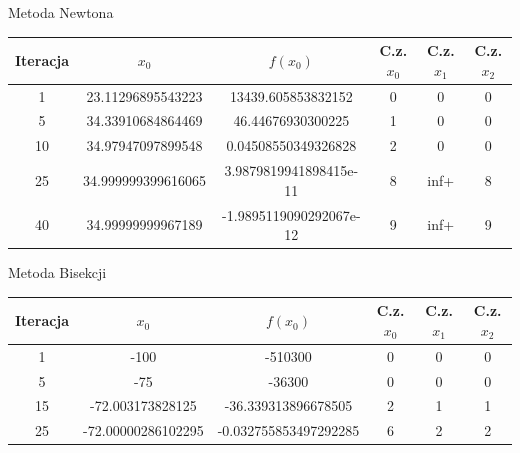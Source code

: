 \documentclass[a4paper]{article}
\begin{document}
    \begin{center}
        Metoda Newtona
    \end{center}
    \begin{center}
        \begin{tabular}{|c|c|c|c|c|c|} 
            \hline
            Iteracja & $x_0$ & $f(x_0)$ & C.z. $x_0$ & C.z. $x_1$ & C.z. $x_2$ \\
            \hline
            1 & 23.11296895543223 & 13439.605853832152 & 0 & 0 & 0 \\
            \hline
            5 & 34.33910684864469 & 46.44676930300225 & 1 & 0 & 0 \\
            \hline
            10 & 34.97947097899548 & 0.04508550349326828 & 2 & 0 & 0 \\
            \hline
            25 & 34.999999399616065 & 3.9879819941898415e-11 & 8 & inf+ & 8 \\
            \hline
            40 & 34.99999999967189 & -1.9895119090292067e-12 & 9 & inf+ & 9 \\
            \hline
        \end{tabular}
    \end{center}
        
    \vspace{5mm}

    \begin{center}
        Metoda Bisekcji
    \end{center}
    \begin{center}
        \begin{tabular}{|c|c|c|c|c|c|} 
            \hline
            Iteracja & $x_0$ & $f(x_0)$ & C.z. $x_0$ & C.z. $x_1$ & C.z. $x_2$ \\
            \hline
            1 & -100 & -510300 & 0 & 0 & 0 \\
            \hline
            5 & -75 & -36300 & 0 & 0 & 0 \\
            \hline
            15 & -72.003173828125 & -36.339313896678505 & 2 & 1 & 1 \\
            \hline
            25 & -72.00000286102295 & -0.032755853497292285 & 6 & 2 & 2 \\
            \hline
        \end{tabular}
    \end{center}
    
    \vspace{5mm}
\end{document}
